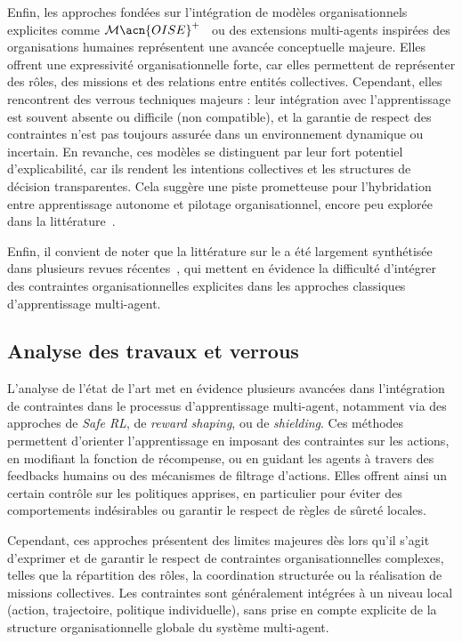 Enfin, les approches fondées sur l’intégration de modèles organisationnels explicites comme $\mathcal{M}\acn{OISE}^+$~\cite{hubner2007using} ou des extensions multi-agents inspirées des organisations humaines représentent une avancée conceptuelle majeure. Elles offrent une expressivité organisationnelle forte, car elles permettent de représenter des rôles, des missions et des relations entre entités collectives. Cependant, elles rencontrent des verrous techniques majeurs : leur intégration avec l’apprentissage est souvent absente ou difficile (non compatible), et la garantie de respect des contraintes n’est pas toujours assurée dans un environnement dynamique ou incertain. En revanche, ces modèles se distinguent par leur fort potentiel d’explicabilité, car ils rendent les intentions collectives et les structures de décision transparentes. Cela suggère une piste prometteuse pour l’hybridation entre apprentissage autonome et pilotage organisationnel, encore peu explorée dans la littérature~\cite{bordini2006jade, chernova2014robot}.

\medskip

\noindent
Enfin, il convient de noter que la littérature sur le  a été largement synthétisée dans plusieurs revues récentes~\cite{Zhang2021, Papoudakis2021}, qui mettent en évidence la difficulté d’intégrer des contraintes organisationnelles explicites dans les approches classiques d’apprentissage multi-agent.

\subsection*{Analyse des travaux et verrous}

L’analyse de l’état de l’art met en évidence plusieurs avancées dans l’intégration de contraintes dans le processus d’apprentissage multi-agent, notamment via des approches de \textit{Safe RL}, de \textit{reward shaping}, ou de \textit{shielding}. Ces méthodes permettent d’orienter l’apprentissage en imposant des contraintes sur les actions, en modifiant la fonction de récompense, ou en guidant les agents à travers des feedbacks humains ou des mécanismes de filtrage d’actions. Elles offrent ainsi un certain contrôle sur les politiques apprises, en particulier pour éviter des comportements indésirables ou garantir le respect de règles de sûreté locales.

Cependant, ces approches présentent des limites majeures dès lors qu’il s’agit d’exprimer et de garantir le respect de contraintes organisationnelles complexes, telles que la répartition des rôles, la coordination structurée ou la réalisation de missions collectives. Les contraintes sont généralement intégrées à un niveau local (action, trajectoire, politique individuelle), sans prise en compte explicite de la structure organisationnelle globale du système multi-agent.

